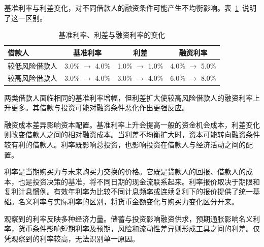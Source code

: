 基准利率与利差变化，对不同借款人的融资条件可能产生不均衡影响。表~\ref{tab:ch6-borrower-financing-rates}~说明了这一区别。

\begin{table}[H]

\centering

\caption{基准利率、利差与融资利率的变化}

\label{tab:ch6-borrower-financing-rates}

\begin{tabular}{@{}lccc@{}}

\toprule

\textbf{借款人} &
\textbf{基准利率} &
\textbf{利差} &
\textbf{融资利率} \\

\midrule

较低风险借款人
& 3.0\% $\rightarrow$ 4.0\%
& 1.0\% $\rightarrow$ 1.0\%
& 4.0\% $\rightarrow$ 5.0\% \\

较高风险借款人
& 3.0\% $\rightarrow$ 4.0\%
& 3.0\% $\rightarrow$ 4.0\%
& 6.0\% $\rightarrow$ 8.0\% \\

\bottomrule

\end{tabular}

\end{table}

两类借款人面临相同的基准利率增幅，但利差扩大使较高风险借款人的融资利率上升更多。其借款与投资可能对融资条件恶化作出更强反应。

融资成本差异影响资本配置。基准利率上升会提高一般的资金机会成本，利差变化则改变借款人之间的相对融资成本。当利差不均衡扩大时，资本可能转向融资条件较有利的借款人。利率既影响总投资，也影响投资在借款人与经济活动之间的配置。



利率是当期购买力与未来购买力交换的价格。它既是贷款人的回报、借款人的成本，也是投资决策的基准，将不同日期的现金流联系起来。利率报价取决于期限和复利计息惯例。有效年利率为比较不同计息频率或连续复利下的报价提供了统一基础。名义利率与实际利率的区别，将货币金额变化与购买力变化区分开来。

观察到的利率反映多种经济力量。储蓄与投资影响融资供求，预期通胀影响名义利率，货币条件影响短期利率及预期，风险和流动性差异则形成工具之间的利差。仅凭观察到的利率较高，无法识别单一原因。


